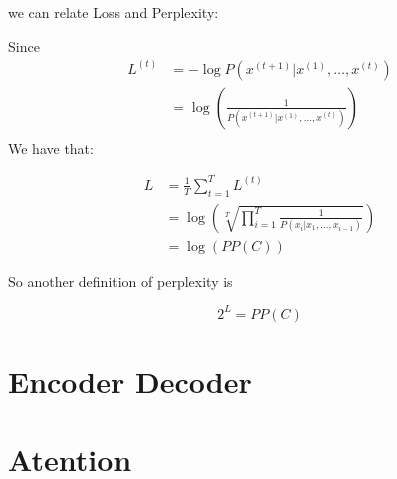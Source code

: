 we can relate Loss and Perplexity:

Since
\begin{align}
L^{(t)} & = - \log P(x^{(t+1)} |x^{(1)}, \dots, x^{(t)})\\
& =  \log(\frac{1}{P(x^{(t+1)}|x^{(1)}, \dots, x^{(t)})})\\
\end{align}
We have that:

\begin{align}
        L &=\frac{1}{T} \sum_{t=1}^{T} L^{(t)}\\
          &= \log\left( \sqrt[T]{\prod_{i=1}^{T}\frac{1}{P(x_i \vert x_1,\dots, x_{i-1})}} \right)\\
          &= \log(PP(C))
\end{align}

So another definition of perplexity is

\begin{equation}
2^{L} = PP(C)
\end{equation}





\section{Encoder Decoder}



\section{Atention}


% 

% 

% 

% 

% 

% 

% 




% 


% 

% 